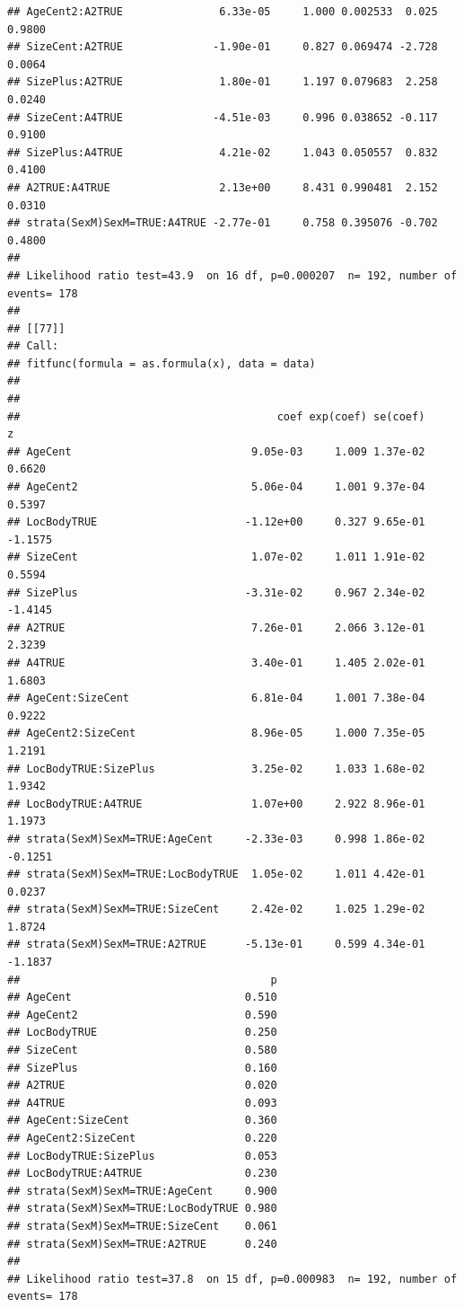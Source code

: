 \documentclass{article}\usepackage[]{graphicx}\usepackage[]{color}
\makeatletter
\newenvironment{kframe}{%
 \def\at@end@of@kframe{}%
 \ifinner\ifhmode%
  \def\at@end@of@kframe{\end{minipage}}%
  \begin{minipage}{\columnwidth}%
 \fi\fi%
 \def\FrameCommand##1{\hskip\@totalleftmargin \hskip-\fboxsep
 \colorbox{shadecolor}{##1}\hskip-\fboxsep
     \hskip-\linewidth \hskip-\@totalleftmargin \hskip\columnwidth}%
 \MakeFramed {\advance\hsize-\width
   \@totalleftmargin\z@ \linewidth\hsize
   \@setminipage}}%
 {\par\unskip\endMakeFramed%
 \at@end@of@kframe}
\newenvironment{knitrout}{}{} %
\makeatother
\begin{document}
\begin{knitrout}
\begin{kframe}
\begin{verbatim}
## AgeCent2:A2TRUE               6.33e-05     1.000 0.002533  0.025 0.9800
## SizeCent:A2TRUE              -1.90e-01     0.827 0.069474 -2.728 0.0064
## SizePlus:A2TRUE               1.80e-01     1.197 0.079683  2.258 0.0240
## SizeCent:A4TRUE              -4.51e-03     0.996 0.038652 -0.117 0.9100
## SizePlus:A4TRUE               4.21e-02     1.043 0.050557  0.832 0.4100
## A2TRUE:A4TRUE                 2.13e+00     8.431 0.990481  2.152 0.0310
## strata(SexM)SexM=TRUE:A4TRUE -2.77e-01     0.758 0.395076 -0.702 0.4800
## 
## Likelihood ratio test=43.9  on 16 df, p=0.000207  n= 192, number of events= 178 
## 
## [[77]]
## Call:
## fitfunc(formula = as.formula(x), data = data)
## 
## 
##                                        coef exp(coef) se(coef)       z
## AgeCent                            9.05e-03     1.009 1.37e-02  0.6620
## AgeCent2                           5.06e-04     1.001 9.37e-04  0.5397
## LocBodyTRUE                       -1.12e+00     0.327 9.65e-01 -1.1575
## SizeCent                           1.07e-02     1.011 1.91e-02  0.5594
## SizePlus                          -3.31e-02     0.967 2.34e-02 -1.4145
## A2TRUE                             7.26e-01     2.066 3.12e-01  2.3239
## A4TRUE                             3.40e-01     1.405 2.02e-01  1.6803
## AgeCent:SizeCent                   6.81e-04     1.001 7.38e-04  0.9222
## AgeCent2:SizeCent                  8.96e-05     1.000 7.35e-05  1.2191
## LocBodyTRUE:SizePlus               3.25e-02     1.033 1.68e-02  1.9342
## LocBodyTRUE:A4TRUE                 1.07e+00     2.922 8.96e-01  1.1973
## strata(SexM)SexM=TRUE:AgeCent     -2.33e-03     0.998 1.86e-02 -0.1251
## strata(SexM)SexM=TRUE:LocBodyTRUE  1.05e-02     1.011 4.42e-01  0.0237
## strata(SexM)SexM=TRUE:SizeCent     2.42e-02     1.025 1.29e-02  1.8724
## strata(SexM)SexM=TRUE:A2TRUE      -5.13e-01     0.599 4.34e-01 -1.1837
##                                       p
## AgeCent                           0.510
## AgeCent2                          0.590
## LocBodyTRUE                       0.250
## SizeCent                          0.580
## SizePlus                          0.160
## A2TRUE                            0.020
## A4TRUE                            0.093
## AgeCent:SizeCent                  0.360
## AgeCent2:SizeCent                 0.220
## LocBodyTRUE:SizePlus              0.053
## LocBodyTRUE:A4TRUE                0.230
## strata(SexM)SexM=TRUE:AgeCent     0.900
## strata(SexM)SexM=TRUE:LocBodyTRUE 0.980
## strata(SexM)SexM=TRUE:SizeCent    0.061
## strata(SexM)SexM=TRUE:A2TRUE      0.240
## 
## Likelihood ratio test=37.8  on 15 df, p=0.000983  n= 192, number of events= 178 

\end{verbatim}
\end{kframe}
\end{knitrout}
\end{document}
